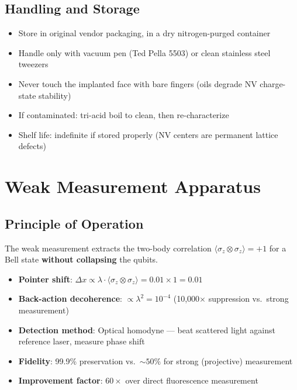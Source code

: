 \documentclass[11pt,a4paper,openany]{book}
\begin{document}

\section{Handling and Storage}

\begin{itemize}[nosep]
  \item Store in original vendor packaging, in a dry nitrogen-purged container
  \item Handle only with vacuum pen (Ted Pella 5503) or clean stainless steel tweezers
  \item Never touch the implanted face with bare fingers (oils degrade NV charge-state stability)
  \item If contaminated: tri-acid boil to clean, then re-characterize
  \item Shelf life: indefinite if stored properly (NV centers are permanent lattice defects)
\end{itemize}


\chapter{Weak Measurement Apparatus}\label{ch:weakmeas}


\section{Principle of Operation}

The weak measurement extracts the two-body correlation $\langle\sigma_z \otimes \sigma_z\rangle = +1$ for a Bell state \textbf{without collapsing} the qubits.

\begin{itemize}[nosep]
  \item \textbf{Pointer shift}: $\Delta x \propto \lambda \cdot \langle\sigma_z \otimes \sigma_z\rangle = 0.01 \times 1 = 0.01$
  \item \textbf{Back-action decoherence}: $\propto \lambda^2 = 10^{-4}$ (10,000$\times$ suppression vs.\ strong measurement)
  \item \textbf{Detection method}: Optical homodyne --- beat scattered light against reference laser, measure phase shift
  \item \textbf{Fidelity}: 99.9\% preservation vs.\ ${\sim}50\%$ for strong (projective) measurement
  \item \textbf{Improvement factor}: $60\times$ over direct fluorescence measurement
\end{itemize}
\end{document}
